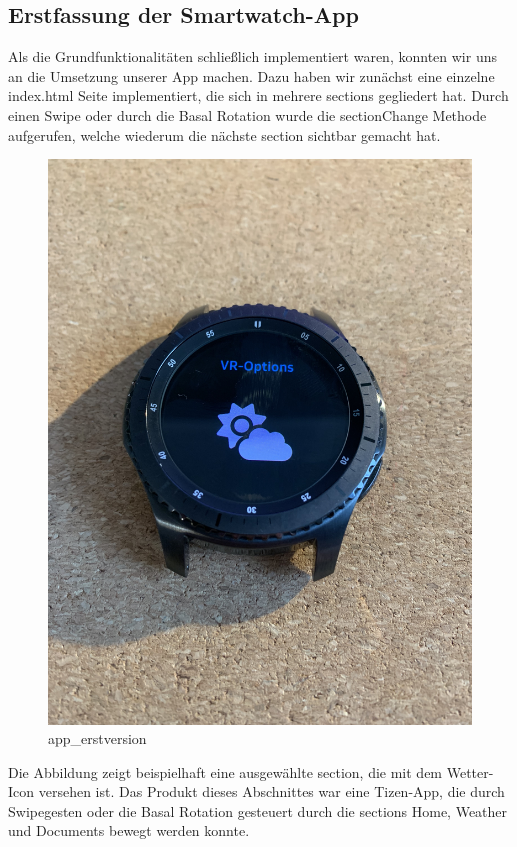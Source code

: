\documentclass[12pt, a4paper]{article}
\begin{document}
\subsection{Erstfassung der Smartwatch-App}

Als die Grundfunktionalitäten schließlich implementiert waren, konnten wir uns an die Umsetzung unserer App machen. Dazu haben wir zunächst eine einzelne index.html Seite implementiert, die sich in mehrere sections gegliedert hat. Durch einen Swipe oder durch die Basal Rotation wurde die sectionChange Methode aufgerufen, welche wiederum die nächste section sichtbar gemacht hat. 


\begin{figure}[h]
	\centering
	\includegraphics[scale=.35]{assets/smartwatch_app_erstversion.jpg}
	\caption{app_erstversion}
	\label{fig:Weather Anwendung in früher Version}
\end{figure}

Die Abbildung zeigt beispielhaft eine ausgewählte section, die mit dem Wetter-Icon versehen ist. Das Produkt dieses Abschnittes war eine Tizen-App, die durch Swipegesten oder die Basal Rotation gesteuert durch die sections Home, Weather und Documents bewegt werden konnte. 
\end{document}
